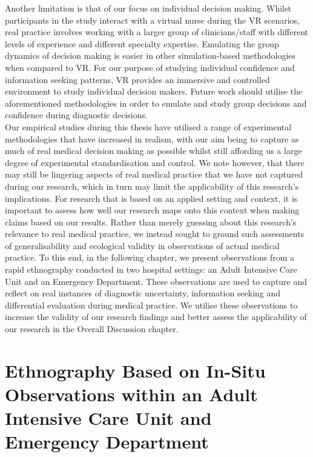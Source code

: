 \documentclass[a4paper, nobind]{templates/ociamthesis}
\begin{document}
\hfill\break
Another limitation is that of our focus on individual decision making. Whilst participants in the study interact with a virtual nurse during the VR scenarios, real practice involves working with a larger group of clinicians/staff with different levels of experience and different specialty expertise. Emulating the group dynamics of decision making is easier in other simulation-based methodologies when compared to VR. For our purpose of studying individual confidence and information seeking patterns, VR provides an immersive and controlled environment to study individual decision makers. Future work should utilise the aforementioned methodologies in order to emulate and study group decisions and confidence during diagnostic decisions.\\

Our empirical studies during this thesis have utilised a range of experimental methodologies that have increased in realism, with our aim being to capture as much of real medical decision making as possible whilst still affording us a large degree of experimental standardisation and control. We note however, that there may still be lingering aspects of real medical practice that we have not captured during our research, which in turn may limit the applicability of this research's implications. For research that is based on an applied setting and context, it is important to assess how well our research maps onto this context when making claims based on our results. Rather than merely guessing about this research's relevance to real medical practice, we instead sought to ground such assessments of generalisability and ecological validity in observations of actual medical practice. To this end, in the following chapter, we present observations from a rapid ethnography conducted in two hospital settings: an Adult Intensive Care Unit and an Emergency Department. These observations are used to capture and reflect on real instances of diagnostic uncertainty, information seeking and differential evaluation during medical practice. We utilise these observations to increase the validity of our research findings and better assess the applicability of our research in the Overall Discussion chapter.

\chapter{Ethnography Based on In-Situ Observations within an Adult Intensive Care Unit and Emergency Department}\label{chapter-6}
\end{document}
